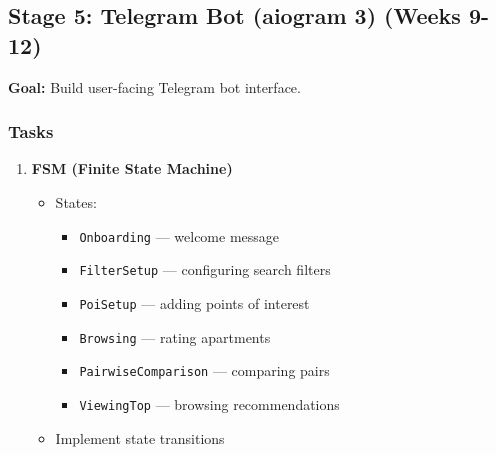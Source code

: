 \documentclass[12pt,a4paper]{article}
\begin{document}
\subsection{Stage 5: Telegram Bot (aiogram 3) (Weeks 9-12)}

\textbf{Goal:} Build user-facing Telegram bot interface.

\subsubsection{Tasks}

\begin{enumerate}
    \item \textbf{FSM (Finite State Machine)}
    \begin{itemize}
        \item States:
        \begin{itemize}
            \item \texttt{Onboarding} — welcome message
            \item \texttt{FilterSetup} — configuring search filters
            \item \texttt{PoiSetup} — adding points of interest
            \item \texttt{Browsing} — rating apartments
            \item \texttt{PairwiseComparison} — comparing pairs
            \item \texttt{ViewingTop} — browsing recommendations
        \end{itemize}
        \item Implement state transitions
    \end{itemize}
    

\end{enumerate}
\end{document}
